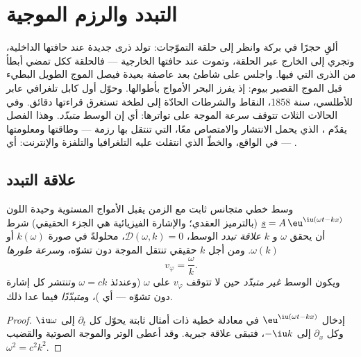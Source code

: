 \chapter{التبدد والرزم الموجية}\label{ch:b2:dispersion-wave-packets}

ألقِ حجرًا في بركة وانظر إلى حلقة التموّجات: تولد ذرى جديدة
عند حافتها الداخلية، وتجري إلى الخارج عبر الحلقة، وتموت عند
حافتها الخارجية --- فالحلقة ككل تمضي أبطأ من الذرى التي فيها.
واجلس على شاطئ بعد عاصفة بعيدة فيصل الموج الطويل البطيء
قبل الموج القصير بيوم: إذ يفرز البحر الأمواج بأطوالها. وحوّل
أول كابل تلغرافي عابر للأطلسي، سنة 1858، النقاط والشرطات
الحادّة إلى لطخة تستغرق قراءتها دقائق. وفي الحالات الثلاث تتوقف
سرعة الموجة على تواترها: أي إن الوسط
\emph{متبدّد}. وهذا الفصل يقدّم ،  الذي يحمل الانتشار والامتصاص معًا، 
التي تنتقل بها رزمة --- وطاقتها ومعلومتها --- في الواقع،
والخطّ الذي انتقلت عليه التلغرافيا والتلفزة والإنترنت: أي
.

\section{علاقة التبدد}

\begin{definition}\label{def:b2:dispersion-wave-packets:relation}
وسط خطي متجانس ثابت مع الزمن يقبل الأمواج المستوية
وحيدة اللون $\underline s = A\,\eu^{\iu(\omega t - kx)}$ (بالترميز
العقدي؛ والإشارة الفيزيائية هي الجزء الحقيقي) شرط أن يحقق $\omega$ و $k$
\emph{علاقة تبدد} الوسط، $\mathcal D(\omega, k)
= 0$، محلولةً في صورة $k(\omega)$ أو $\omega(k)$. ومن أجل $k$ حقيقي تنتقل الموجة
دون تشوّه، و\emph{سرعة طورها}
\[
v_\varphi = \frac\omega k .
\]
ويكون الوسط \emph{غير متبدّد} حين لا تتوقف $v_\varphi$ على
$\omega$ (وعندئذ $\omega = ck$ وتنتشر كل إشارة دون تشوّه --- أي
)، و\emph{متبدّدًا} فيما عدا ذلك.
\end{definition}

\begin{proof}
إدخال $\eu^{\iu(\omega t - kx)}$ في معادلة خطية ذات أمثال
ثابتة يحوّل كل $\partial_t$ إلى $\iu\omega$ وكل $\partial_x$ إلى
$-\iu k$، فتبقى علاقة جبرية. وقد أعطى الوتر والموجة الصوتية
والقضيب $\omega^2 = c^2k^2$.
\end{proof}

